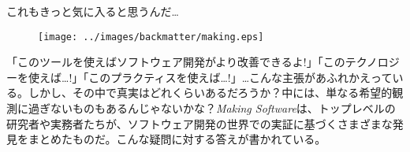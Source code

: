 
\thispagestyle{empty}

\sffamily

\Large これもきっと気に入ると思うんだ\ldots

\normalsize

\begin{figure}[h!]
\centering
\texttt{[image: ../images/backmatter/making.eps]}
\end{figure}

「このツールを使えばソフトウェア開発がより改善できるよ!」「このテクノロジーを使えば…!」「このプラクティスを使えば…!」…こんな主張があふれかえっている。しかし、その中で真実はどれくらいあるだろうか？中には、単なる希望的観測に過ぎないものもあるんじゃないかな？\emph{Making Software}は、トップレベルの研究者や実務者たちが、ソフトウェア開発の世界での実証に基づくさまざまな発見をまとめたものだ。こんな疑問に対する答えが書かれている。

\vspace{-0.1cm}

